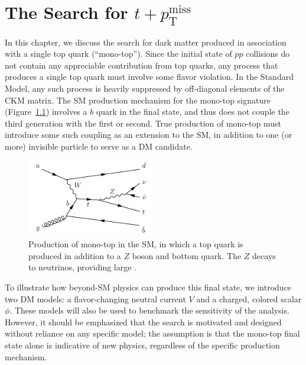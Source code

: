 \boldmath
\chapter{The Search for ${t+p_\text{T}^\text{miss}}$}
\unboldmath
\label{sec:mt}

In this chapter, we discuss the search for dark matter produced in association with a single top quark (``mono-top'').
Since the initial state of $pp$ collisions do not contain any appreciable contribution from top quarks, any process that produces a single top quark must involve some flavor violation.
In the Standard Model, any such process is heavily suppressed by off-diagonal elements of the CKM matrix.
The SM production mechanism for the mono-top signature (Figure~\ref{fig:mt:tzq}) involves a $b$ quark in the final state, and thus does not couple the third generation with the first or second.
True production of mono-top must introduce some such coupling as an extension to the SM, in addition to one (or more) invisible particle to serve as a DM candidate.

\begin{figure}[]
    \begin{center}
        \includegraphics[width=0.5\textwidth]{figures/monotop/diagrams/tzq.pdf}
        \caption{Production of mono-top in the SM, in which a top quark is produced in addition to a $Z$ boson and bottom quark. The $Z$ decays to neutrinos, providing large \ptmiss.}
        \label{fig:mt:tzq}
    \end{center}
\end{figure}

To illustrate how beyond-SM physics can produce this final state, we introduce two DM models: a flavor-changing neutral current $V$ and a charged, colored scalar $\phi$.
These models will also be used to benchmark the sensitivity of the analysis.
However, it should be emphasized that the search is motivated and designed without reliance on any specific model; the assumption is that the mono-top final state alone is indicative of new physics, regardless of the specific production mechanism.

